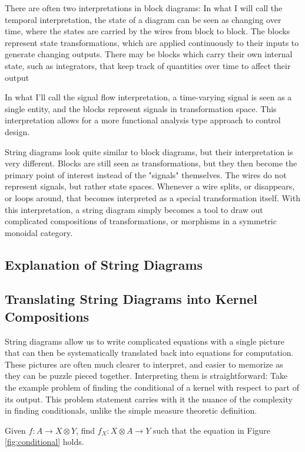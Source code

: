 There are often two interpretations in block diagrams:
In what I will call the temporal interpretation, the state of a diagram can be seen as changing over time, where the states are carried by the wires from block to block. The blocks represent state transformations, which are applied continuously to their inputs to generate changing outputs.
There may be blocks which carry their own internal state, such as integrators, that keep track of quantities over time to affect their output

In what I'll call the signal flow interpretation, a time-varying signal is seen as a single entity, and the blocks represent signals in transformation space. This interpretation allows for a more functional analysis type approach to control design.

String diagrams look quite similar to block diagrams, but their interpretation is very different.
Blocks are still seen as transformations, but they then become the primary point of interest instead of the "signals" themselves.
The wires do not represent signals, but rather state spaces.
Whenever a wire splits, or disappears, or loops around, that becomes interpreted as a special transformation itself.
With this interpretation, a string diagram simply becomes a tool to draw out complicated compositions of transformations, or morphisms in a symmetric monoidal category.

\subsection{Explanation of String Diagrams}

\subsection{Translating String Diagrams into Kernel Compositions}
String diagrams allow us to write complicated equations with a single picture that can then be systematically translated back into equations for computation.
These pictures are often much clearer to interpret, and easier to memorize as they can be puzzle pieced together.
Interpreting them is straightforward: Take the example problem of finding the conditional of a kernel with respect to part of its output.
This problem statement carries with it the nuance of the complexity in finding conditionals, unlike the simple measure theoretic definition.

Given $f:A\rightarrow X\otimes Y$, find $f_X : X\otimes A \rightarrow Y$ such that the equation in Figure \ref{fig:conditional} holds.

